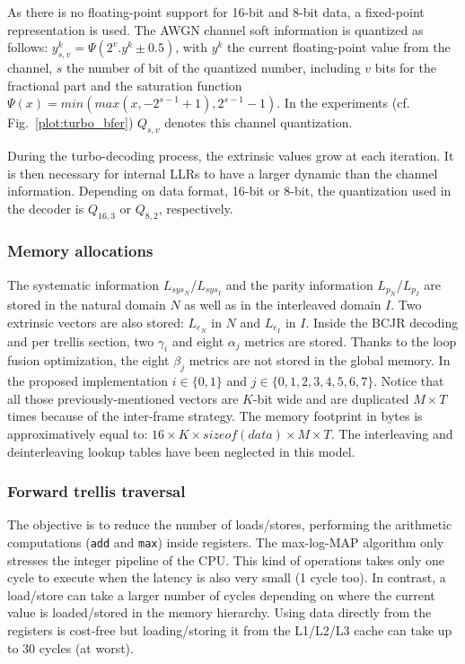As there is no floating-point support for 16-bit and 8-bit data, a fixed-point
representation is used. The AWGN channel soft information is quantized as
follows: $y_{s,v}^k = \Psi(2^v . y^k \pm 0.5)$, with $y^k$ the current
floating-point value from the channel, $s$ the number of bit of the quantized
number, including $v$ bits for the fractional part and the saturation function
$\Psi(x) = min(max(x, -2^{s-1} +1), 2^{s-1} -1)$. In the experiments
(cf. Fig.~\ref{plot:turbo_bfer}) $Q_{s,v}$ denotes this channel quantization.

During the turbo-decoding process, the extrinsic values grow at each iteration.
It is then necessary for internal LLRs to have a larger dynamic than the channel
information. Depending on data format, 16-bit or 8-bit, the quantization used in
the decoder is $Q_{16,3}$ or $Q_{8,2}$, respectively.

\subsubsection{Memory allocations}

The systematic information $L_{sys_N}$/$L_{sys_I}$ and the parity information
$L_{p_N}$/$L_{p_I}$  are stored in the natural domain $N$ as well as in the
interleaved domain $I$. Two extrinsic vectors are also stored: $L_{e_N}$ in $N$
and $L_{e_I}$ in $I$. Inside the BCJR decoding and per trellis section, two
$\gamma_{i}$ and eight $\alpha_{j}$ metrics are stored. Thanks to the loop
fusion optimization, the eight $\beta_j$ metrics are not stored in the global
memory. In the proposed implementation $i \in \{0,1\}$ and
$j \in \{0,1,2,3,4,5,6,7\}$. Notice that all those previously-mentioned vectors
are $K$-bit wide and are duplicated $M\times T$ times because of the inter-frame
strategy. The memory footprint in bytes is approximatively equal to:
$16 \times K \times sizeof(data) \times M \times T$.
The interleaving and deinterleaving lookup tables have been neglected in this
model.

\subsubsection{Forward trellis traversal}

The objective is to reduce the number of loads/stores, performing the arithmetic
computations (\verb|add| and \verb|max|) inside registers. The max-log-MAP
algorithm only stresses the integer pipeline of the CPU. This kind of operations
takes only one cycle to execute when the latency is also very small (1 cycle
too). In contrast, a load/store can take a larger number of cycles depending on
where the current value is loaded/stored in the memory hierarchy. Using data
directly from the registers is cost-free but loading/storing it from the
L1/L2/L3 cache can take up to 30 cycles (at worst).

